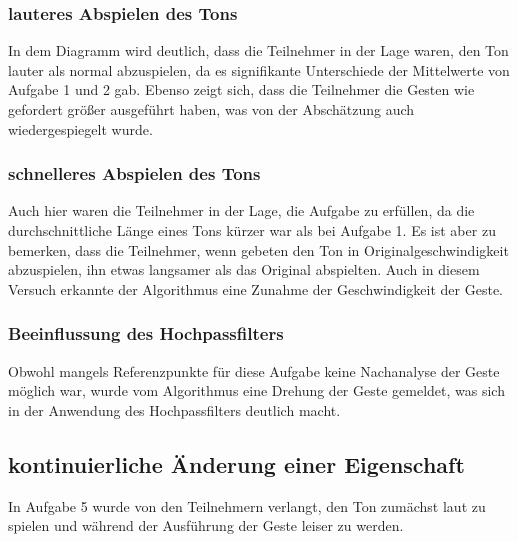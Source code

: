 \documentclass{llncs}
\begin{document}
\subsubsection{lauteres Abspielen des Tons}
In dem Diagramm wird deutlich, dass die Teilnehmer in der Lage waren, den Ton lauter als normal abzuspielen, da es signifikante Unterschiede der Mittelwerte von Aufgabe 1 und 2 gab. Ebenso zeigt sich, dass die Teilnehmer die Gesten wie gefordert größer ausgeführt haben, was von der Abschätzung auch wiedergespiegelt wurde.

\subsubsection{schnelleres Abspielen des Tons}
Auch hier waren die Teilnehmer in der Lage, die Aufgabe zu erfüllen, da die durchschnittliche Länge eines Tons kürzer war als bei Aufgabe 1. Es ist aber zu bemerken, dass die Teilnehmer, wenn gebeten den Ton in Originalgeschwindigkeit abzuspielen, ihn etwas langsamer als das Original abspielten. Auch in diesem Versuch erkannte der Algorithmus eine Zunahme der Geschwindigkeit der Geste.

\subsubsection{Beeinflussung des Hochpassfilters}
Obwohl mangels Referenzpunkte für diese Aufgabe keine Nachanalyse der Geste möglich war, wurde vom Algorithmus eine Drehung der Geste gemeldet, was sich in der Anwendung des Hochpassfilters deutlich macht.

\subsection{kontinuierliche Änderung einer Eigenschaft}
In Aufgabe 5 wurde von den Teilnehmern verlangt, den Ton zumächst laut zu spielen und während der Ausführung der Geste leiser zu werden. 


 


\end{document}
